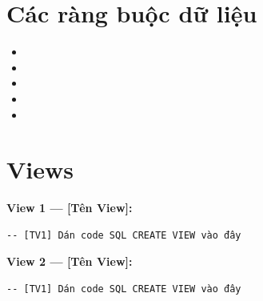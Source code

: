 \section{Các ràng buộc dữ liệu}\label{Sec2.3}

\begin{lem}\label{lem2.1}

\end{lem}


\begin{itemize}
  \item \texttt{} %
  \item \texttt{} %
  \item \texttt{} %
  \item \texttt{} %
  \item \texttt{} %
\end{itemize}

\section{Views}\label{Sec2.4}

\begin{thm}\label{thm2.1}

\end{thm}


\noindent\textbf{View 1 — [Tên View]:} %

\begin{lstlisting}[style=sql, caption={View [TênView1]}]
-- [TV1] Dán code SQL CREATE VIEW vào đây
\end{lstlisting}

\noindent\textbf{View 2 — [Tên View]:} %

\begin{lstlisting}[style=sql, caption={View [TênView2]}]
-- [TV1] Dán code SQL CREATE VIEW vào đây
\end{lstlisting}

